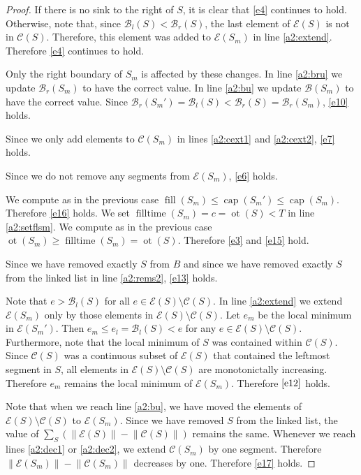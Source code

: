 \documentclass[11pt,a4paper]{article}
\newcommand{\norm}[1]{\left\lVert #1 \right\rVert}
\DeclareMathOperator{\capp}{cap}
\DeclareMathOperator{\ot}{ot}
\DeclareMathOperator{\Fill}{fill}
\DeclareMathOperator{\filltime}{filltime}
\begin{document}
\begin{proof}
If there is no sink to the right of $S$, it is clear that \ref{e4} continues to hold.
Otherwise, note that, since $\mathcal{B}_l(S) < \mathcal{B}_r(S)$, the last element of $\mathcal{E}(S)$ is not in $\mathcal{C}(S)$.
Therefore, this element was added to $\mathcal{E}(S_m)$ in line \ref{a2:extend}.
Therefore \ref{e4} continues to hold.

Only the right boundary of $S_m$ is affected by these changes.
In line \ref{a2:bru} we update $\mathcal{B}_r(S_m)$ to have the correct value.
In line \ref{a2:bu} we update $\mathcal{B}(S_m)$ to have the correct value.
Since $\mathcal{B}_r(S_m') = \mathcal{B}_l(S) < \mathcal{B}_r(S) = \mathcal{B}_r(S_m)$, \ref{e10} holds.

Since we only add elements to $\mathcal{C}(S_m)$ in lines \ref{a2:cext1} and \ref{a2:cext2}, \ref{e7} holds.

Since we do not remove any segments from $\mathcal{E}(S_m)$, \ref{e6} holds.

We compute as in the previous case $\Fill(S_m) \le \capp(S_m') \le \capp(S_m)$.
Therefore \ref{e16} holds.
We set $\filltime(S_m) = c = \ot(S) < T$ in line \ref{a2:setflsm}.
We compute as in the previous case $\ot(S_m)\ge\filltime(S_m)=\ot(S)$.
Therefore \ref{e3} and \ref{e15} hold.

Since we have removed exactly $S$ from $B$ and since we have removed exactly $S$ from the linked list in line \ref{a2:rems2}, \ref{e13} holds.

Note that $e > \mathcal{B}_l(S)$ for all $e\in\mathcal{E}(S)\setminus\mathcal{C}(S)$.
In line \ref{a2:extend} we extend $\mathcal{E}(S_m)$ only by those elements in $\mathcal{E}(S)\setminus\mathcal{C}(S)$.
Let $e_m$ be the local minimum in $\mathcal{E}(S_m')$.
Then $e_m\le e_l=\mathcal{B}_l(S)<e$ for any $e\in\mathcal{E}(S)\setminus\mathcal{C}(S)$.
Furthermore, note that the local minimum of $S$ was contained within $\mathcal{C}(S)$.
Since $\mathcal{C}(S)$ was a continuous subset of $\mathcal{E}(S)$ that contained the leftmost segment in $S$, all elements in $\mathcal{E}(S)\setminus\mathcal{C}(S)$ are monotonictally increasing.
Therefore $e_m$ remains the local minimum of $\mathcal{E}(S_m)$.
Therefore $\ref{e12}$ holds.

Note that when we reach line \ref{a2:bu}, we have moved the elements of $\mathcal{E}(S)\setminus\mathcal{C}(S)$ to $\mathcal{E}(S_m)$.
Since we have removed $S$ from the linked list, the value of $\sum_S\left(\norm{\mathcal{E}(S)} - \norm{\mathcal{C}(S)}\right)$ remains the same.
Whenever we reach lines \ref{a2:dec1} or \ref{a2:dec2}, we extend $\mathcal{C}(S_m)$ by one segment.
Therefore $\norm{\mathcal{E}(S_m)} - \norm{\mathcal{C}(S_m)}$ decreases by one.
Therefore \ref{e17} holds.


\end{proof}
\end{document}
